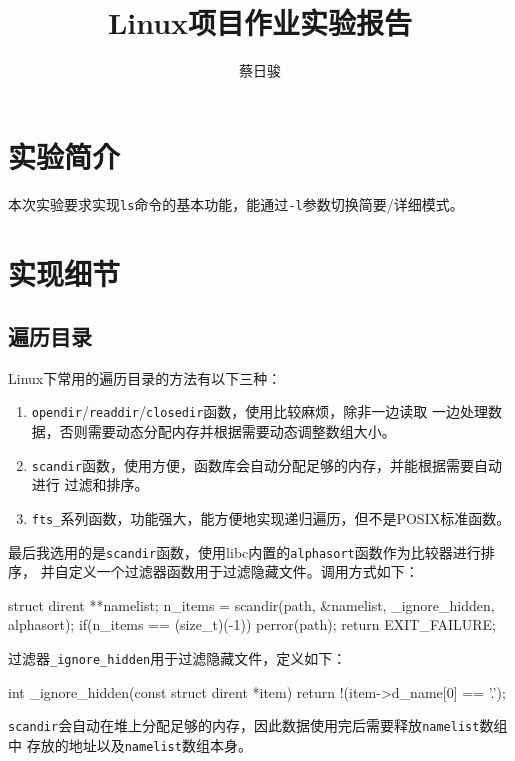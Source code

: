 \documentclass[a4paper, adobefonts]{ctexart}
\title{Linux项目作业实验报告}
\author{蔡日骏\quad12348003}
\begin{document}
\maketitle

\section{实验简介}
\label{sec:shi_yan_jian_jie_}
本次实验要求实现\verb|ls|命令的基本功能，能通过\verb|-l|参数切换简要/详细模式。

\section{实现细节}
\label{sec:shi_xian_xi_jie_}

\subsection{遍历目录}
\label{sub:bian_li_mu_lu_}
Linux下常用的遍历目录的方法有以下三种：

\begin{enumerate}
    \item \verb|opendir|/\verb|readdir|/\verb|closedir|函数，使用比较麻烦，除非一边读取
        一边处理数据，否则需要动态分配内存并根据需要动态调整数组大小。
    \item \verb|scandir|函数，使用方便，函数库会自动分配足够的内存，并能根据需要自动进行
        过滤和排序。
    \item \verb|fts_|系列函数，功能强大，能方便地实现递归遍历，但不是POSIX标准函数。
\end{enumerate}

最后我选用的是\verb|scandir|函数，使用libc内置的\verb|alphasort|函数作为比较器进行排序，
并自定义一个过滤器函数用于过滤隐藏文件。调用方式如下：

\begin{ccode}
struct dirent **namelist;
n_items = scandir(path, &namelist, _ignore_hidden, alphasort);
if(n_items == (size_t)(-1)) {
    perror(path);
    return EXIT_FAILURE;
}
\end{ccode}

过滤器\verb|_ignore_hidden|用于过滤隐藏文件，定义如下：

\begin{ccode}
int _ignore_hidden(const struct dirent *item)
{
    return !(item->d_name[0] == '.');
}
\end{ccode}

\verb|scandir|会自动在堆上分配足够的内存，因此数据使用完后需要释放\verb|namelist|数组中
存放的地址以及\verb|namelist|数组本身。
\end{document}
